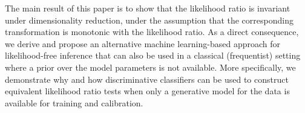 \documentclass[12pt]{article}
\numberwithin{equation}{section}
\theoremstyle{plain}
\begin{document}
The main result of this paper is to show that the likelihood ratio is invariant
under dimensionality reduction, under the assumption that the corresponding
transformation is monotonic with the likelihood ratio. As a direct consequence,
we derive and propose an alternative machine learning-based approach for
likelihood-free inference that can also be used in a classical (frequentist)
setting where a prior over the model parameters is not available. More
specifically, we demonstrate why and how discriminative classifiers can be used
to construct equivalent likelihood ratio tests when only a generative model for
the data is available for training and calibration.

%
%
%
\end{document}
